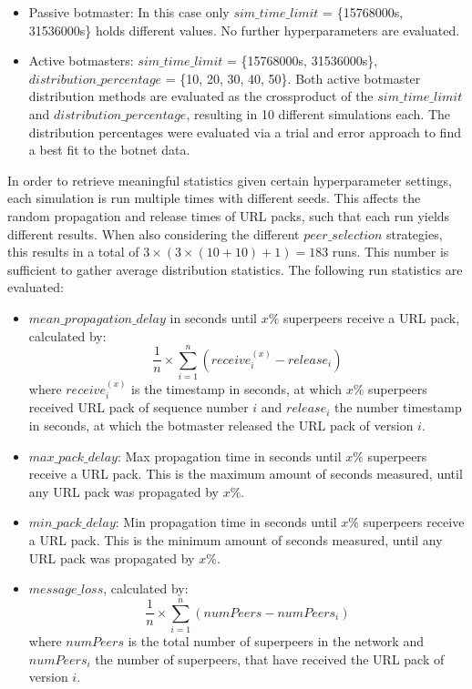 \documentclass{article}
\begin{document}
\begin{itemize}
    \item Passive botmaster: In this case only $sim\_time\_limit$ = \{15768000s, 31536000s\} holds different values. No further hyperparameters are evaluated.
    \item Active botmasters: $sim\_time\_limit$ = \{15768000s, 31536000s\}, $distribution\_percentage$ = \{10, 20, 30, 40, 50\}. Both active botmaster distribution methods are evaluated as the crossproduct of the $sim\_time\_limit$ and $distribution\_percentage$, resulting in 10 different simulations each. The distribution percentages were evaluated via a trial and error approach to find a best fit to the botnet data.
\end{itemize}

In order to retrieve meaningful statistics given certain hyperparameter settings, each simulation is run multiple times with different seeds. This affects the random propagation and release times of URL packs, such that each run yields different results. When also considering the different $peer\_selection$ strategies, this results in a total of $3 \times (3 \times (10 + 10) + 1) = 183$ runs. This number is sufficient to gather average distribution statistics. The following run statistics are evaluated:

\begin{itemize}
    \item $mean\_propagation\_delay$ in seconds until $x\%$ superpeers receive a URL pack, calculated by: $$\frac{1}{n} \times \sum_{i=1}^{n}(receive_{i}^{(x)} - release_{i})$$ where $receive_{i}^{(x)}$ is the timestamp in seconds, at which $x\%$ superpeers received URL pack of sequence number $i$ and $release_{i}$ the number timestamp in seconds, at which the botmaster released the URL pack of version $i$.
    \item $max\_pack\_delay$: Max propagation time in seconds until $x\%$ superpeers receive a URL pack. This is the maximum amount of seconds measured, until any URL pack was propagated by $x\%$.
    \item $min\_pack\_delay$: Min propagation time in seconds until $x\%$ superpeers receive a URL pack. This is the minimum amount of seconds measured, until any URL pack was propagated by $x\%$.
    \item $message\_loss$, calculated by: $$\frac{1}{n} \times \sum_{i=1}^{n}(numPeers - numPeers_{i})$$ where $numPeers$ is the total number of superpeers in the network and $numPeers_{i}$ the number of superpeers, that have received the URL pack of version $i$.
\end{itemize}
\end{document}
